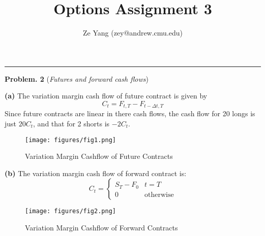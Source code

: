 \documentclass[10 pt]{hwtemplate} %
\title{\textbf{Options Assignment 3}}
\author{Ze Yang (zey@andrew.cmu.edu)}
\begin{document}
\maketitle


\noindent\rule{16cm}{0.4pt}
\textbf{Problem. 2} (\textit{Futures and forward cash flows})\\
\begin{solution}
\textbf{(a)} The variation margin cash flow of future contract is given by
$$
C_t = F_{t,T} - F_{t-\Delta t, T}
$$
Since future contracts are linear in there cash flows, the cash flow for 20 longs is just $20C_t$, and that for 2 shorts is $-2C_t$. 
\begin{figure}[H]
  \centering
  \captionsetup{justification=centering}
  \caption{\label{fig:q21}Variation Margin Cashflow of Future Contracts}
  \texttt{[image: figures/fig1.png]}
\end{figure}

\textbf{(b)} The variation margin cash flow of forward contract is:
$$
C_t = \begin{cases}S_T - F_0 & t=T\\
0 & \text{otherwise}
\end{cases}
$$

\begin{figure}[H]
  \centering
  \captionsetup{justification=centering}
  \caption{\label{fig:q22}Variation Margin Cashflow of Forward Contracts}
  \texttt{[image: figures/fig2.png]}
\end{figure}
\end{solution}
\end{document}
